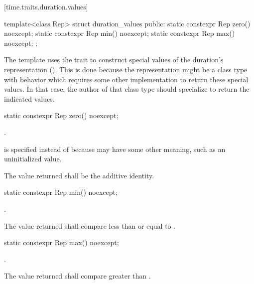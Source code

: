 [time.traits.duration.values]{}

%
\begin{itemdecl}
template<class Rep>
  struct duration_values {
  public:
    static constexpr Rep zero() noexcept;
    static constexpr Rep min() noexcept;
    static constexpr Rep max() noexcept;
};
\end{itemdecl}

\pnum
The  template uses the  trait to
construct special values of the duration's representation (). This is
done because the representation might be a class type with behavior which
requires some other implementation to return these special values. In that case,
the author of that class type should specialize  to
return the indicated values.

%
\begin{itemdecl}
static constexpr Rep zero() noexcept;
\end{itemdecl}

\begin{itemdescr}
\pnum
\returns
{}.
\begin{note}
 is specified instead of
 because  may have some other meaning, such as an
uninitialized value.
\end{note}

\pnum
\remarks
The value returned shall be the additive identity.
\end{itemdescr}

%
\begin{itemdecl}
static constexpr Rep min() noexcept;
\end{itemdecl}

\begin{itemdescr}
\pnum
\returns
{}.

\pnum
\remarks
The value returned shall compare less than or equal to .
\end{itemdescr}

%
\begin{itemdecl}
static constexpr Rep max() noexcept;
\end{itemdecl}

\begin{itemdescr}
\pnum
\returns
{}.

\pnum
\remarks
The value returned shall compare greater than .
\end{itemdescr}


